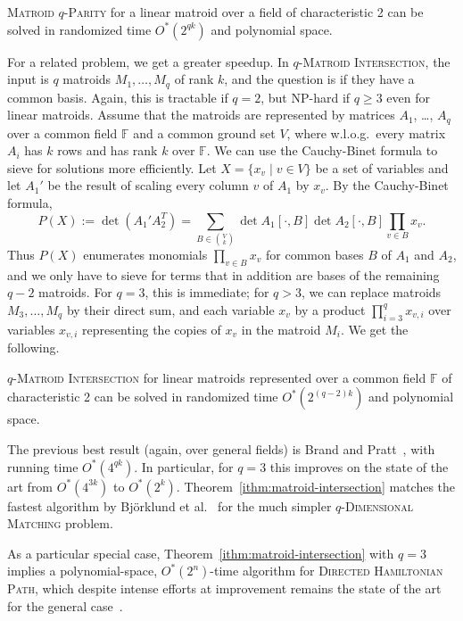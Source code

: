 \documentclass{theoretics}
\newcommand{\F}{\ensuremath{\mathbb F}\xspace}
\begin{document}
\begin{corollary}
  \textsc{Matroid $q$-Parity} for a linear matroid over a field of
  characteristic 2 can be solved in randomized time $O^*(2^{qk})$ and
  polynomial space.  
\end{corollary}

For a related problem, we get a greater speedup. 
In \textsc{$q$-Matroid Intersection}, the input is $q$ matroids $M_1,
\ldots, M_q$ of rank $k$, and the question is if they have a common
basis. Again, this is tractable if $q=2$, but NP-hard if $q \geq 3$
even for linear matroids. Assume that the matroids are represented by
matrices $A_1$, \ldots, $A_q$ over a common field $\F$ and a common
ground set $V$, where w.l.o.g.\ every matrix $A_i$ has $k$ rows and
has rank $k$ over $\F$.
We can use the Cauchy-Binet formula to sieve for solutions more efficiently.
Let $X=\{x_v \mid v \in V\}$ be a set of variables and let $A_1'$ be
the result of scaling every column $v$ of $A_1$ by $x_v$.
By the Cauchy-Binet formula,
\[
  P(X) := \det (A_1' A_2^T) = \sum_{B \in \binom{V}{k}} \det
  A_1[\cdot,B] \det A_2[\cdot,B] \prod_{v \in B} x_v.
\]
Thus $P(X)$ enumerates monomials $\prod_{v \in B} x_v$ for
common bases $B$ of $A_1$ and $A_2$, and we only have to sieve for
terms that in addition are bases of the remaining $q-2$ matroids. 
For $q=3$, this is immediate; for $q>3$, we can replace matroids $M_3, \ldots, M_q$
by their direct sum, and each variable $x_v$ by a product $\prod_{i=3}^q x_{v,i}$
over variables $x_{v,i}$ representing the copies of $x_v$ in the matroid $M_i$.
We get the following. 

\begin{theorem} \label{ithm:matroid-intersection}
  \textsc{$q$-Matroid Intersection} for linear matroids represented
  over a common field $\F$ of characteristic 2 can be solved in
  randomized time $O^*(2^{(q-2)k})$ and polynomial space.
\end{theorem}

The previous best result (again, over general fields) is Brand and Pratt~\cite{BrandP21}, with
running time $O^*(4^{qk})$. In particular, for $q=3$ this improves on
the state of the art from $O^*(4^{3k})$ to $O^*(2^k)$.
Theorem~\ref{ithm:matroid-intersection} matches the fastest algorithm
by Bj\"orklund et al.~\cite{BjorklundHKK17narrow}
for the much simpler \textsc{$q$-Dimensional Matching} problem.

As a particular special case, Theorem~\ref{ithm:matroid-intersection} with $q=3$ 
implies a polynomial-space, $O^*(2^n)$-time algorithm for \textsc{Directed Hamiltonian Path},
which despite intense efforts at improvement remains the state of the
art for the general case~\cite{Bellman62,BjorklundKK17directed,CyganKN18hamilton}. 
\end{document}

